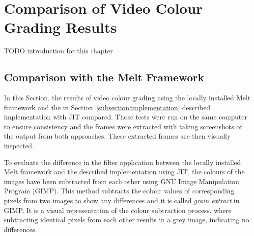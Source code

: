 \documentclass[../MasterThesis.tex]{subfiles}
\begin{document}
	
	
%
%
%
%
%
%
%
%
\newpage
\section{Comparison of Video Colour Grading Results} \label{section:experimentalevaluationanddiscussion}  


TODO introduction for this chapter 


\subsection{Comparison with the Melt Framework} \label{section:comparisonMelt}


In this Section, the results of video colour grading using the locally installed Melt framework and the in Section~\ref{subsection:implementation} described implementation with JIT compared. 
Those tests were run on the same computer to ensure consistency and the frames were extracted with taking screenshots of the output from both approaches. These extracted frames are then visually inspected. 




To evaluate the difference in the filter application between the locally installed Melt framework and the described implementation using JIT, the colours of the images have been subtracted from each other using GNU Image Manipulation Program (GIMP). 
This method subtracts the colour values of corresponding pixels from two images to show any differences and it is called \textit{grain extract} in GIMP. It is a visual representation of the colour subtraction process, where subtracting identical pixels from each other results in a grey image, indicating no differences.~\cite{gimp}
\end{document}
